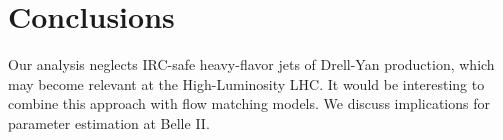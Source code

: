 \section{Conclusions}\label{sec:conclusions}

Our analysis neglects IRC-safe heavy-flavor jets of Drell-Yan
production, which may become relevant at the High-Luminosity LHC. It
would be interesting to combine this approach with flow matching models.
We discuss implications for parameter estimation at Belle II.

